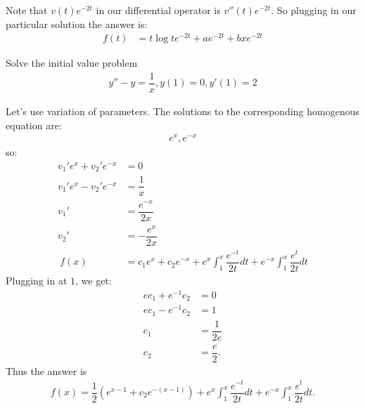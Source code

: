 \documentclass[11pt]{article}
\begin{document}
        \begin{solution}
            Note that $v(t)e^{-2t}$ in our differential operator is $v''(t)e^{-2t}$. So plugging in our particular solution the answer is:
            \begin{align}
                f(t) &= t \log t e^{-2t}+ ae^{-2t} + bxe^{-2t}
            \end{align}
        \end{solution} \newpage
        \begin{problem}[Problem 4]
            Solve the initial value problem 
            \begin{align}
                y'' - y = \dfrac{1}{x}, y(1) = 0, y'(1) = 2
            \end{align}
        \end{problem}
        \begin{solution}
            Let's use variation of parameters. The solutions to the corresponding homogenous equation are:
            \begin{align}
                e^x, e^{-x}
            \end{align}
            so:
            \begin{align}
                v_1'e^x + v_2'e^{-x} &= 0 \\ 
                v_1'e^x - v_2'e^{-x} &= \dfrac{1}{x} \\
                v_1' &= \dfrac{e^{-x}}{2x} \\
                v_2' &= -\dfrac{e^x}{2x} \\\
                f(x) &= c_1e^x + c_2e^{-x} + e^x \int_1^x \dfrac{e^{-t}}{2t} dt + e^{-x} \int_1^x \dfrac{e^t}{2t} dt 
            \end{align}
            Plugging in at $1$, we get:
            \begin{align}
                ec_1 + e^{-1}c_2 &= 0 \\
                ec_1 - e^{-1}c_2 &= 1 \\
                c_1 &= \dfrac{1}{2e} \\
                c_2 &= \dfrac{e}{2}.
            \end{align}
            Thus the answer is 
            \begin{align}
                \boxed{
                f(x) = \dfrac{1}{2} \left(e^{x-1} + c_2e^{-(x-1)}\right) + e^x \int_1^x \dfrac{e^{-t}}{2t} dt + e^{-x} \int_1^x \dfrac{e^t}{2t} dt 
                .}
            \end{align}
        \end{solution}
\end{document}
